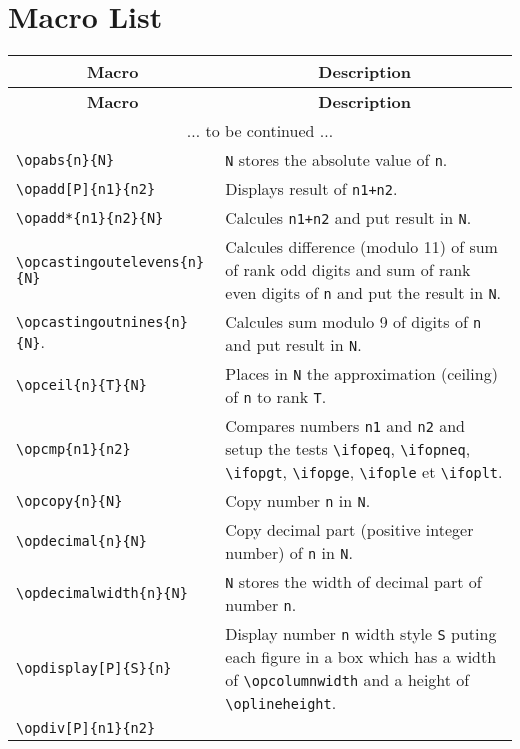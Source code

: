 \documentclass[12pt]{report}
\begin{document}
\section{Macro List}
\label{sec:Liste des macros}
%
\noindent\begin{longtable}{|l|p{6.3cm}|}
  \hline
  \multicolumn{1}{|c|}{\textbf{Macro}} &
  \multicolumn{1}{c|}{\textbf{Description}} \\\hline\hline
  \endfirsthead
  \hline
  \multicolumn{1}{|c|}{\textbf{Macro}} &
  \multicolumn{1}{c|}{\textbf{Description}} \\\hline\hline
  \endhead
  \hline
  \multicolumn{2}{|c|}{$\ldots$ to be continued $\ldots$}\\
  \hline
  \endfoot
  \hline
  \endlastfoot
  \verb+\opabs{n}{N}+ &
  \verb+N+ stores the absolute value of \verb+n+. \\\hline
  \verb+\opadd[P]{n1}{n2}+ &
  Displays result of \verb-n1+n2-. \\\hline
  \verb+\opadd*{n1}{n2}{N}+ &
  Calcules \verb-n1+n2- and put result in \verb+N+. \\\hline
  \verb+\opcastingoutelevens{n}{N}+ &
  Calcules difference (modulo 11) of sum of rank odd digits and sum of
  rank even digits of \verb+n+ and put the result in \verb+N+.\\\hline 
  \verb+\opcastingoutnines{n}{N}+. &
  Calcules sum modulo 9 of digits of \verb+n+ and put result in
  \verb+N+. \\\hline
  \verb+\opceil{n}{T}{N}+ &
  Places in \verb+N+ the approximation (ceiling) of \verb+n+ to rank
  \verb+T+. \\\hline
  \verb+\opcmp{n1}{n2}+ &
  Compares numbers \verb+n1+ and \verb+n2+ and setup the tests
  \verb+\ifopeq+, \verb+\ifopneq+, \verb+\ifopgt+, \verb+\ifopge+,
  \verb+\ifople+ et \verb+\ifoplt+. \\\hline
  \verb+\opcopy{n}{N}+ &
  Copy number \verb+n+ in \verb+N+. \\\hline
  \verb+\opdecimal{n}{N}+ &
  Copy decimal part (positive integer number) of \verb+n+ in
  \verb+N+. \\\hline
  \verb+\opdecimalwidth{n}{N}+ &
  \verb+N+ stores the width of decimal part of number \verb+n+.
  \\\hline
  \verb+\opdisplay[P]{S}{n}+ &
  Display number \verb+n+ width style \verb+S+ puting each figure in a
  box which has a width of \verb+\opcolumnwidth+ and a height of
  \verb+\oplineheight+. \\\hline
  \verb+\opdiv[P]{n1}{n2}+ &

\end{longtable}
\end{document}
